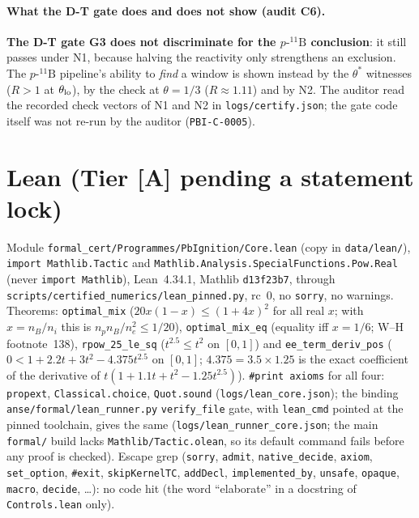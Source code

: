 \documentclass[10pt]{article}
\newcommand{\tier}[1]{\textsf{[#1]}}
\newcommand{\tA}{\tier{A}}
\newcommand{\lean}[1]{\texttt{#1}}
\newcommand{\pB}{p\text{-}{}^{11}\mathrm{B}}
\begin{document}
\paragraph{What the D-T gate does and does not show (audit C6).} \textbf{The D-T gate G3 does not discriminate for the $\pB$ conclusion}: it still passes under N1, because halving the reactivity only strengthens an exclusion. The $\pB$ pipeline's ability to \emph{find} a window is shown instead by the $\theta^\ast$ witnesses ($R>1$ at $\theta_{\rm lo}$), by the check at $\theta=1/3$ ($R\approx1.11$) and by N2. The auditor read the recorded check vectors of N1 and N2 in \texttt{logs/certify.json}; the gate code itself was not re-run by the auditor (\texttt{PBI-C-0005}).

\section{Lean (Tier \tA{} pending a statement lock)}\label{sec:lean}
Module \texttt{formal\_cert/Programmes/PbIgnition/Core.lean} (copy in \texttt{data/lean/}), \texttt{import Mathlib.Tactic} and \texttt{Mathlib.Analysis.SpecialFunctions.Pow.Real} (never \texttt{import Mathlib}), Lean~4.34.1, Mathlib \texttt{d13f23b7}, through \texttt{scripts/certified\_numerics/lean\_pinned.py}, rc~$0$, no \texttt{sorry}, no warnings. Theorems:
\lean{optimal\_mix} ($20x(1-x)\le(1+4x)^2$ for all real $x$; with $x=n_B/n_i$ this is $n_pn_B/n_e^2\le1/20$), \lean{optimal\_mix\_eq} (equality iff $x=1/6$; W--H footnote~138), \lean{rpow\_25\_le\_sq} ($t^{2.5}\le t^2$ on $[0,1]$) and \lean{ee\_term\_deriv\_pos} ($0<1+2.2t+3t^2-4.375t^{2.5}$ on $[0,1]$; $4.375=3.5\times1.25$ is the exact coefficient of the derivative of $t(1+1.1t+t^2-1.25t^{2.5})$). \texttt{\#print axioms} for all four: \lean{propext}, \lean{Classical.choice}, \lean{Quot.sound} (\texttt{logs/lean\_core.json}); the binding \texttt{anse/formal/lean\_runner.py} \texttt{verify\_file} gate, with \texttt{lean\_cmd} pointed at the pinned toolchain, gives the same (\texttt{logs/lean\_runner\_core.json}; the main \texttt{formal/} build lacks \texttt{Mathlib/Tactic.olean}, so its default command fails before any proof is checked). Escape grep (\texttt{sorry}, \texttt{admit}, \texttt{native\_decide}, \texttt{axiom}, \texttt{set\_option}, \texttt{\#exit}, \texttt{skipKernelTC}, \texttt{addDecl}, \texttt{implemented\_by}, \texttt{unsafe}, \texttt{opaque}, \texttt{macro}, \texttt{decide}, \dots): no code hit (the word ``elaborate'' in a docstring of \texttt{Controls.lean} only).
\end{document}
